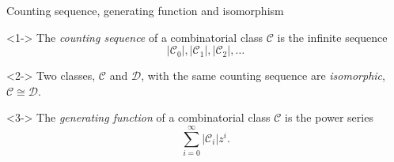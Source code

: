 \begin{frame}{Counting sequence, generating function and isomorphism}
    \begin{definition}<1->
        The \emph{counting sequence} of a combinatorial class $\mathcal{C}$ is the infinite sequence
        \[
            |\mathcal{C}_0|, |\mathcal{C}_1|, |\mathcal{C}_2|, \dotsc
        \]
    \end{definition}
    \begin{definition}<2->
        Two classes, $\mathcal{C}$ and $\mathcal{D}$, with the same counting sequence are \emph{isomorphic}, $\mathcal{C} \cong \mathcal{D}$.
    \end{definition}
    \begin{definition}<3->
        The \emph{generating function} of a combinatorial class $\mathcal{C}$ is the power series
        \[
            \sum_{i=0}^\infty|\mathcal{C}_i|z^i.
        \]
    \end{definition}
\end{frame}